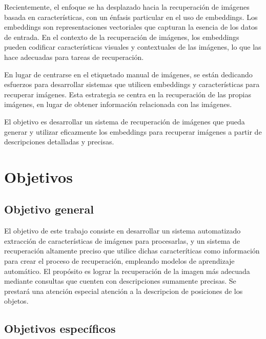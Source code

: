 Recientemente, el enfoque se ha desplazado hacia la recuperación de imágenes basada en características, con un énfasis particular en el uso de embeddings. Los embeddings son representaciones vectoriales que capturan la esencia de los datos de entrada. En el contexto de la recuperación de imágenes, los embeddings pueden codificar características visuales y contextuales de las imágenes, lo que las hace adecuadas para tareas de recuperación.

En lugar de centrarse en el etiquetado manual de imágenes, se están dedicando esfuerzos para desarrollar sistemas que utilicen embeddings y características para recuperar imágenes. Esta estrategia se centra en la recuperación de las propias imágenes, en lugar de obtener información relacionada con las imágenes.

El objetivo es desarrollar un sistema de recuperación de imágenes que pueda generar y utilizar eficazmente los embeddings para recuperar imágenes a partir de descripciones detalladas y precisas.

\section{Objetivos}

\subsection{Objetivo general}

El objetivo de este trabajo consiste en desarrollar un sistema automatizado extracci\'on de caracter\'isticas de im\'agenes para procesarlas, y un sistema de recuperaci\'on altamente preciso que utilice dichas caracter\'iticas como informaci\'on para crear el proceso de recuperaci\'on, empleando modelos de aprendizaje autom\'atico. El prop\'osito es lograr la recuperaci\'on de la imagen m\'as adecuada mediante consultas que cuenten con descripciones sumamente precisas. Se prestar\'a una atenci\'on especial atenci\'on a la descripcion de posiciones de los objetos.

\subsection{Objetivos espec\'ificos}

